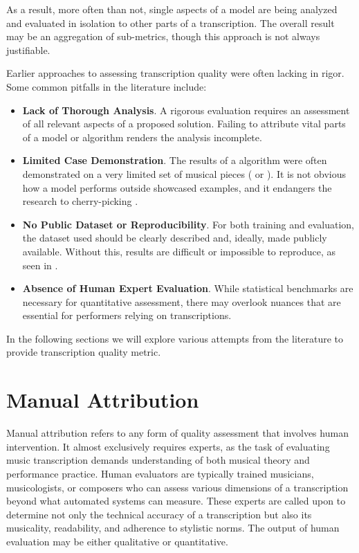 As a result, more often than not, single aspects of a model are being analyzed and evaluated in isolation to other parts of a transcription. The overall result may be an aggregation of sub-metrics, though this approach is not always justifiable.

Earlier approaches to assessing transcription quality were often lacking in rigor. Some common pitfalls in the literature include:\begin{itemize}
	\item {\bf Lack of Thorough Analysis}. A rigorous evaluation requires an assessment of all relevant aspects of a proposed solution. Failing to attribute vital parts of a model or algorithm renders the analysis incomplete.
	\item {\bf Limited Case Demonstration}. The results of a algorithm were often demonstrated on a very limited set of musical pieces (\cite{Takeda2002} or \cite{Yang2005}). It is not obvious how a model performs outside showcased examples, and it endangers the research to cherry-picking \missing.
	\item {\bf No Public Dataset or Reproducibility}. For both training and evaluation, the dataset used should be clearly described and, ideally, made publicly available. Without this, results are difficult or impossible to reproduce, as seen in \cite{Takeda2002}.
	\item {\bf Absence of Human Expert Evaluation}. While statistical benchmarks are necessary for quantitative assessment, there may overlook nuances that are essential for performers relying on transcriptions.
\end{itemize}

In the following sections we will explore various attempts from the literature to provide transcription quality metric.

\section{Manual Attribution}

Manual attribution refers to any form of quality assessment that involves human intervention. It almost exclusively requires experts, as the task of evaluating music transcription demands understanding of both musical theory and performance practice. Human evaluators are typically trained musicians, musicologists, or composers who can assess various dimensions of a transcription beyond what automated systems can measure. These experts are called upon to determine not only the technical accuracy of a transcription but also its musicality, readability, and adherence to stylistic norms. The output of human evaluation may be either qualitative or quantitative. 

